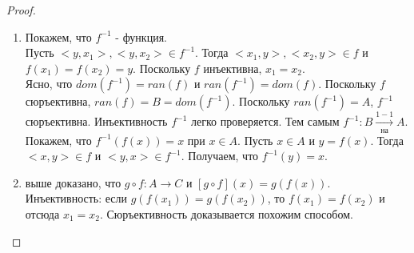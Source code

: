 \documentclass[a4paper]{article}
\theoremstyle{definition}
\begin{document}
\begin{enumerate}
       \begin{proof}
        \begin{enumerate}
         \item Покажем, что $f^{-1}$ - функция.\\ Пусть \mbox{$<y, x_1>, <y, x_2> \in f^{-1}$}. Тогда $<x_1, y>, <x_2, y>\in f$ и $f(x_1) = f(x_2) = y$. Поскольку $f$ инъективна, $x_1 = x_2$.\\
               Ясно, что $dom(f^{-1}) = ran(f)$ и $ran(f^{-1}) = dom(f)$. Поскольку $f$ сюръективна, $ran(f) = B = dom(f^{-1})$. Поскольку $ran(f^{-1}) = A$, $f^{-1}$ сюръективна. Инъективность $f^{-1}$ легко проверяется. Тем самым $f^{-1}: B\xrightarrow[\textit{на}]{1-1} A$.\\
               Покажем, что $f^{-1}(f(x)) = x$ при $x \in A$. Пусть  $x \in A$ и $y = f(x)$. Тогда $<x, y>\in f$ и $<y, x> \in f^{-1}$. Получаем, что $f^{-1}(y) = x$.
         \item выше доказано, что $g \circ f: A \rightarrow C$ и $[g \circ f](x) = g(f(x))$. Инъективность: если $g(f(x_1)) = g(f(x_2))$, то $f(x_1) = f(x_2)$ и отсюда $x_1 = x_2$. Сюръективность доказывается похожим способом.
        \end{enumerate}


\end{proof}
\end{enumerate}
\end{document}
